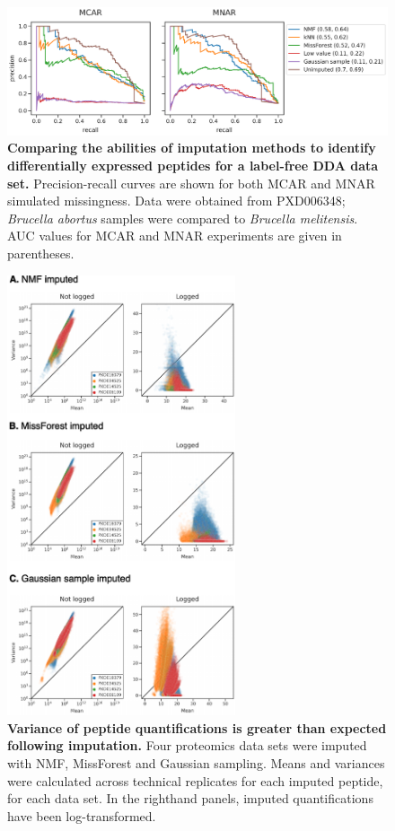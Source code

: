 \documentclass{article}
\begin{document}
\begin{figure}
  \centering
  \includegraphics[width=1.0\textwidth]{figures/differential-expression-label-free-DDA-figure.pdf}
  \caption{{\bf Comparing the abilities of imputation methods to identify differentially expressed peptides for a label-free DDA data set.} Precision-recall curves are shown for both MCAR and MNAR simulated missingness. Data were obtained from PXD006348; \textit{Brucella abortus} samples were compared to \textit{Brucella melitensis}. AUC values for MCAR and MNAR experiments are given in parentheses.}
  \label{fig:PR-curves-DDA}
\end{figure}

\begin{figure}
  \centering
  \includegraphics[width=0.6\textwidth]{figures/imputed-distributions.pdf}
  \caption{{\bf Variance of peptide quantifications is greater than expected following imputation.} Four proteomics data sets were imputed with NMF, MissForest and Gaussian sampling. Means and variances were calculated across technical replicates for each imputed peptide, for each data set. In the righthand panels, imputed quantifications have been log-transformed.}
  \label{fig:distributions-post-impute}
\end{figure} 
\end{document}
